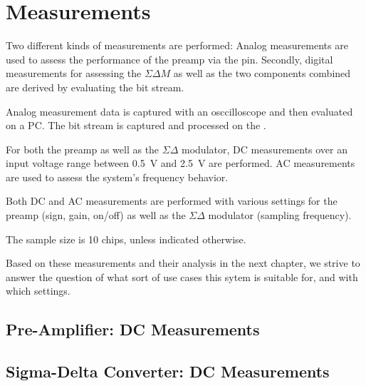 \chapter{Measurements}
\label{chap:measurements}


Two different  kinds of measurements  are performed:  Analog  measurements are
used  to assess  the  performance  of the  preamp  via  the 
pin. Secondly, digital measurements for assessing the $\Sigma\Delta M$ as well
as the two components combined are derived by evaluating the bit stream.

Analog measurement data  is captured with an osccilloscope  and then evaluated
on a PC. The bit stream is captured and processed on the \raspi.

For both the  preamp as well as the $\Sigma\Delta$  modulator, DC measurements
over an input  voltage range between \SI{0.5}{\volt}  and  \SI{2.5}{\volt} are
performed. AC measurements are used to assess the system's frequency behavior.

Both DC and AC measurements are performed with various settings for the preamp
(sign,  gain,  on/off)  as  well as  the  $\Sigma\Delta$  modulator  (sampling
frequency).

The sample size is 10 chips, unless indicated otherwise.

Based on these measurements and their  analysis in the next chapter, we strive
to answer the question  of what sort of use cases this  sytem is suitable for,
and with which settings.



\section{Pre-Amplifier: DC Measurements}
\label{sec:preAmpDC}

\section{Sigma-Delta Converter: DC Measurements}
\label{sec:sigdelDC}

